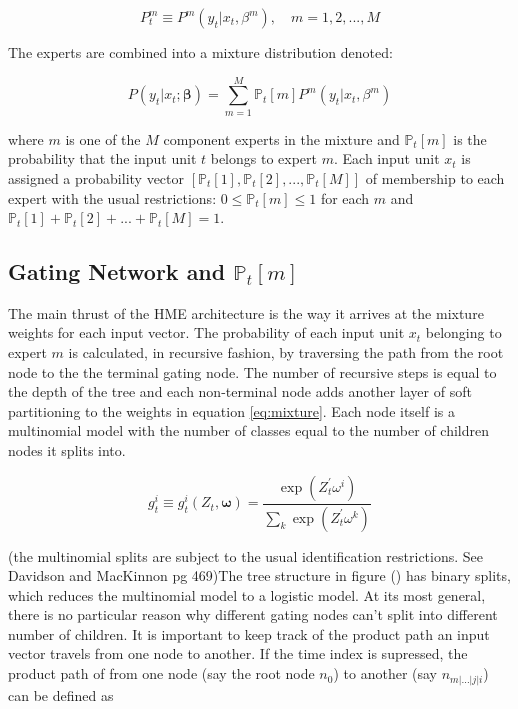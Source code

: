 \documentclass[12pt]{article}
\begin{document}
\begin{equation} \label{eq:ConditionalDistribution}
  P^{m}_{t} \equiv P^{m}(y_{t}|x_{t},\beta^{m}), \quad m = 1,2,...,M
\end{equation}

The experts are combined into a mixture distribution denoted:

\begin{equation} \label{eq:mixture}
  P(y_{t}|x_{t};\boldsymbol{\beta}) = \sum_{m=1}^{M}\mathbb{P}_{t}[m]P^{m}(y_{t}|x_{t},\beta^{m})
\end{equation}

where $m$ is one of the $M$ component experts in the mixture and
$\mathbb{P}_{t}[m]$ is the probability that the input unit $t$ belongs
to expert $m$. Each input unit $x_{t}$ is assigned a probability vector
$[\mathbb{P}_{t}[1], \mathbb{P}_{t}[2],...,\mathbb{P}_{t}[M]]$ of
membership to each expert with the usual restrictions:
$0 \leq \mathbb{P}_{t}[m] \leq 1$ for each $m$ and
$\mathbb{P}_{t}[1] + \mathbb{P}_{t}[2] + ... + \mathbb{P}_{t}[M] = 1$.


\subsection{Gating Network and $\mathbb{P}_{t}[m]$}
The main thrust of the HME architecture is the way it arrives at the mixture
weights for each input vector. The probability of each input unit $x_{t}$
belonging to expert $m$ is calculated, in recursive fashion, by traversing the
path from the root node to the the terminal gating node. The number of
recursive steps is equal to the depth of the tree and each non-terminal node
adds another layer of soft partitioning to the weights in equation 
\ref{eq:mixture}. Each node itself is a multinomial model with the number of
classes equal to the number of children nodes it splits into. 

\begin{equation} \label{eq:softmax}
  g^{i}_{t} \equiv g^{i}_{t}(Z_{t},\boldsymbol{\omega}) = \frac{\exp(Z_{t}^{\prime}\omega^{i})}{\sum_{k}{\exp(Z_{t}^{\prime}\omega^{k})}}
\end{equation}

(the multinomial splits are subject to the usual identification restrictions.
See Davidson and MacKinnon pg 469)The tree structure in figure () has binary
splits, which reduces the multinomial model to a logistic model. At its most
general, there is no particular reason why different gating nodes can't split
into different number of children. It is important to keep track of the product
path an input vector travels from one node to another. If the time index is
supressed, the product path of from one node (say the root node $n_{0}$) to
another (say $n_{m|\ldots|j|i}$) can be defined as
\end{document}
